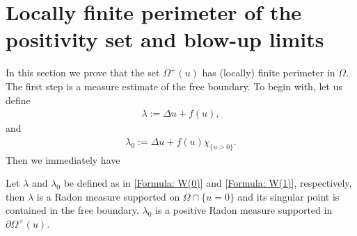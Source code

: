 \documentclass[11pt,reqno]{amsart}
\begin{document}
\section{Locally finite perimeter of the positivity set and blow-up limits}
In this section we prove that the set $\varOmega^{+}(u)$ has (locally) finite perimeter in $\Omega$. The first step is a measure estimate of the free boundary. To begin with, let us define
\begin{align}\label{Formula: W(0)}
	\lambda:=\Delta u+f(u),
\end{align}
and
\begin{align}\label{Formula: W(1)}
	\lambda_{0}:=\Delta u+f(u)\chi_{\{u>0\}}.
\end{align}
Then we immediately have
\begin{lemma}
	Let $\lambda$ and $\lambda_{0}$ be defined as in \eqref{Formula: W(0)} and \eqref{Formula: W(1)}, respectively, then  $\lambda$ is a Radon measure supported on $\Omega\cap\{u=0\}$ and its singular point is contained in the free boundary. $\lambda_{0}$ is a positive Radon measure supported in $\partial\varOmega^{+}(u)$.
\end{lemma}
\end{document}
